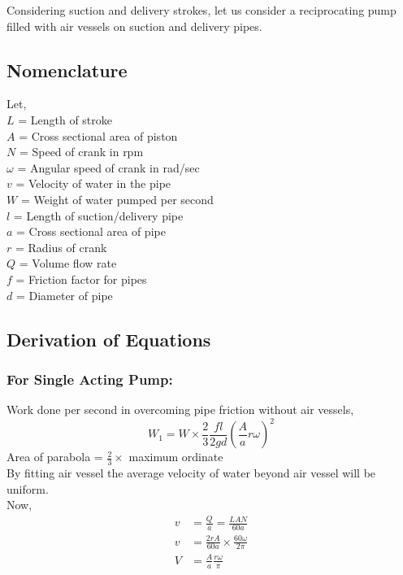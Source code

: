 \documentclass{article}
\begin{document}
    \begin{multicols}{2}
      
      Considering suction and delivery strokes, let us consider a reciprocating pump filled with air vessels on suction and delivery pipes.
      
      \subsection*{Nomenclature}
      Let,\\
      $L$ = Length of stroke \\
      $A$ = Cross sectional area of piston \\
      $N$ = Speed of crank in rpm \\
      $\omega$ = Angular speed of crank in rad/sec \\
      $v$ = Velocity of water in the pipe \\
      $W$ = Weight of water pumped per second \\
      $l$ = Length of suction/delivery pipe \\
      $a$ = Cross sectional area of pipe \\
      $r$ = Radius of crank \\
      $Q$ = Volume flow rate \\
      $f$ = Friction factor for pipes \\
      $d$ = Diameter of pipe \\

      \subsection*{Derivation of Equations}
      \subsubsection*{For Single Acting Pump:}
      Work done per second in overcoming pipe friction without air vessels,
      $$W_1 = W \times \frac{2}{3} \frac{fl}{2 g d} \left(\frac{A}{a} r \omega \right)^2 $$
      Area of parabola = $\frac{2}{3} \times$ maximum ordinate \\
      
      By fitting air vessel the average velocity of water beyond air vessel will be uniform. \\
      Now,
      \begin{align*}
        v &= \frac{Q}{a} = \frac{LAN}{60 a} \\
        v &= \frac{2 r A}{60 a}\times \frac{60 \omega}{2 \pi} \\
        V &= \frac{A}{a} \frac{r \omega}{\pi} \\
      \end{align*}


\end{multicols}
\end{document}
